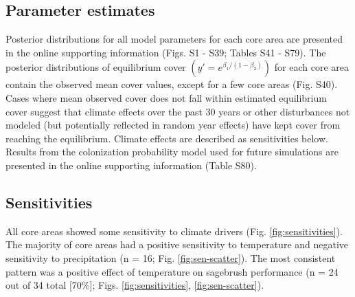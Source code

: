 \documentclass[
  12pt,
]{article}
\begin{document}
\hypertarget{parameter-estimates}{%
\subsection{Parameter estimates}\label{parameter-estimates}}

Posterior distributions for all model parameters for each core area are presented in the online supporting information (Figs. S1 - S39; Tables S41 - S79).
The posterior distributions of equilibrium cover \(\left(y' = e^{\beta_1 / \left(1 - \beta_2 \right)}\right)\) for each core area contain the observed mean cover values, except for a few core areas (Fig. S40).
Cases where mean observed cover does not fall within estimated equilibrium cover suggest that climate effects over the past 30 years or other disturbances not modeled (but potentially reflected in random year effects) have kept cover from reaching the equilibrium.
Climate effects are described as sensitivities below.
Results from the colonization probability model used for future simulations are presented in the online supporting information (Table S80).

\hypertarget{sensitivities}{%
\subsection{Sensitivities}\label{sensitivities}}

All core areas showed some sensitivity to climate drivers (Fig. \ref{fig:sensitivities}).
The majority of core areas had a positive sensitivity to temperature and negative sensitivity to precipitation (n = 16; Fig. \ref{fig:sen-scatter}).
The most consistent pattern was a positive effect of temperature on sagebrush performance (n = 24 out of 34 total {[}70\%{]}; Figs. \ref{fig:sensitivities}, \ref{fig:sen-scatter}).
\end{document}
